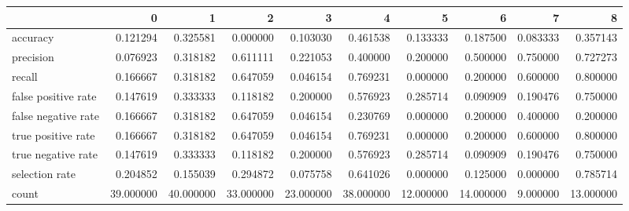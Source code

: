 \begin{tabular}{lrrrrrrrrr}
\toprule
{} &          0 &          1 &          2 &          3 &          4 &          5 &          6 &         7 &          8 \\
\midrule
accuracy            &   0.121294 &   0.325581 &   0.000000 &   0.103030 &   0.461538 &   0.133333 &   0.187500 &  0.083333 &   0.357143 \\
precision           &   0.076923 &   0.318182 &   0.611111 &   0.221053 &   0.400000 &   0.200000 &   0.500000 &  0.750000 &   0.727273 \\
recall              &   0.166667 &   0.318182 &   0.647059 &   0.046154 &   0.769231 &   0.000000 &   0.200000 &  0.600000 &   0.800000 \\
false positive rate &   0.147619 &   0.333333 &   0.118182 &   0.200000 &   0.576923 &   0.285714 &   0.090909 &  0.190476 &   0.750000 \\
false negative rate &   0.166667 &   0.318182 &   0.647059 &   0.046154 &   0.230769 &   0.000000 &   0.200000 &  0.400000 &   0.200000 \\
true positive rate  &   0.166667 &   0.318182 &   0.647059 &   0.046154 &   0.769231 &   0.000000 &   0.200000 &  0.600000 &   0.800000 \\
true negative rate  &   0.147619 &   0.333333 &   0.118182 &   0.200000 &   0.576923 &   0.285714 &   0.090909 &  0.190476 &   0.750000 \\
selection rate      &   0.204852 &   0.155039 &   0.294872 &   0.075758 &   0.641026 &   0.000000 &   0.125000 &  0.000000 &   0.785714 \\
count               &  39.000000 &  40.000000 &  33.000000 &  23.000000 &  38.000000 &  12.000000 &  14.000000 &  9.000000 &  13.000000 \\
\bottomrule
\end{tabular}
